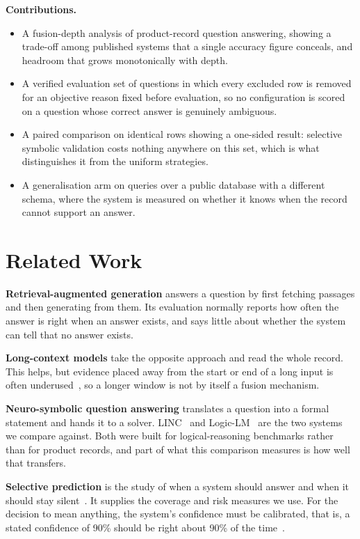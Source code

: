 \documentclass[conference]{IEEEtran}
\begin{document}
\textbf{Contributions.}
\begin{itemize}
\item A fusion-depth analysis of product-record question answering, showing a
      trade-off among published systems that a single accuracy figure conceals,
      and headroom that grows monotonically with depth.
\item A verified evaluation set of \VerifiedN{} questions in which every
      excluded row is removed for an objective reason fixed before evaluation,
      so no configuration is scored on a question whose correct answer is
      genuinely ambiguous.
\item A paired comparison on identical rows showing a one-sided result:
      selective symbolic validation costs nothing anywhere on this set, which is
      what distinguishes it from the uniform strategies.
\item A generalisation arm on \OffN{} queries over a public database with a
      different schema, where the system is measured on whether it knows when
      the record cannot support an answer.
\end{itemize}

\section{Related Work}
\textbf{Retrieval-augmented generation} answers a question by first fetching
passages and then generating from them. Its evaluation normally reports how
often the answer is right when an answer exists, and says little about whether
the system can tell that no answer exists.

\textbf{Long-context models} take the opposite approach and read the whole
record. This helps, but evidence placed away from the start or end of a long
input is often underused~\cite{liu2024lost}, so a longer window is not by itself
a fusion mechanism.

\textbf{Neuro-symbolic question answering} translates a question into a formal
statement and hands it to a solver. LINC~\cite{olausson2023linc} and
Logic-LM~\cite{pan2023logiclm} are the two systems we compare against. Both were
built for logical-reasoning benchmarks rather than for product records, and part
of what this comparison measures is how well that transfers.

\textbf{Selective prediction} is the study of when a system should answer and
when it should stay silent~\cite{elyaniv2010foundations}. It supplies the
coverage and risk measures we use. For the decision to mean anything, the
system's confidence must be calibrated, that is, a stated confidence of 90\%
should be right about 90\% of the time~\cite{guo2017calibration}.
\end{document}
